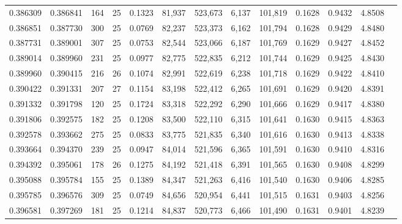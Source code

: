 \begin{tabular}{rrrrrrrrrrrrr}
0.386309 & 0.386841 &   164 &  25 &                                     0.1323 &  81,937 & 523,673 &   6,137 & 101,819 & 0.1628 & 0.9432 & 4.8508 \\
0.386851 & 0.387730 &   300 &  25 &                                     0.0769 &  82,237 & 523,373 &   6,162 & 101,794 & 0.1628 & 0.9429 & 4.8480 \\
0.387731 & 0.389001 &   307 &  25 &                                     0.0753 &  82,544 & 523,066 &   6,187 & 101,769 & 0.1629 & 0.9427 & 4.8452 \\
0.389014 & 0.389960 &   231 &  25 &                                     0.0977 &  82,775 & 522,835 &   6,212 & 101,744 & 0.1629 & 0.9425 & 4.8430 \\
0.389960 & 0.390415 &   216 &  26 &                                     0.1074 &  82,991 & 522,619 &   6,238 & 101,718 & 0.1629 & 0.9422 & 4.8410 \\
0.390422 & 0.391331 &   207 &  27 &                                     0.1154 &  83,198 & 522,412 &   6,265 & 101,691 & 0.1629 & 0.9420 & 4.8391 \\
0.391332 & 0.391798 &   120 &  25 &                                     0.1724 &  83,318 & 522,292 &   6,290 & 101,666 & 0.1629 & 0.9417 & 4.8380 \\
0.391806 & 0.392575 &   182 &  25 &                                     0.1208 &  83,500 & 522,110 &   6,315 & 101,641 & 0.1630 & 0.9415 & 4.8363 \\
0.392578 & 0.393662 &   275 &  25 &                                     0.0833 &  83,775 & 521,835 &   6,340 & 101,616 & 0.1630 & 0.9413 & 4.8338 \\
0.393664 & 0.394370 &   239 &  25 &                                     0.0947 &  84,014 & 521,596 &   6,365 & 101,591 & 0.1630 & 0.9410 & 4.8316 \\
0.394392 & 0.395061 &   178 &  26 &                                     0.1275 &  84,192 & 521,418 &   6,391 & 101,565 & 0.1630 & 0.9408 & 4.8299 \\
0.395088 & 0.395784 &   155 &  25 &                                     0.1389 &  84,347 & 521,263 &   6,416 & 101,540 & 0.1630 & 0.9406 & 4.8285 \\
0.395785 & 0.396576 &   309 &  25 &                                     0.0749 &  84,656 & 520,954 &   6,441 & 101,515 & 0.1631 & 0.9403 & 4.8256 \\
0.396581 & 0.397269 &   181 &  25 &                                     0.1214 &  84,837 & 520,773 &   6,466 & 101,490 & 0.1631 & 0.9401 & 4.8239 \\

\end{tabular}
